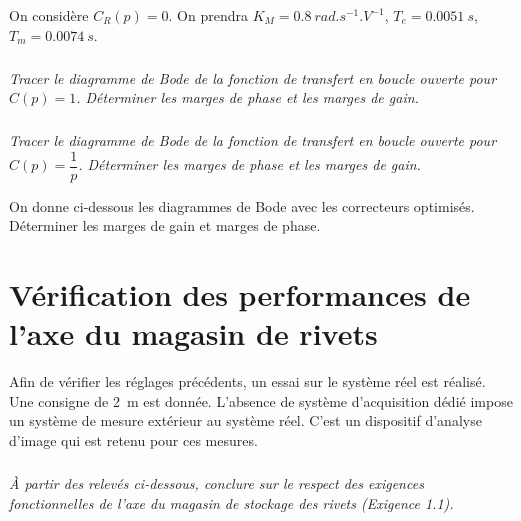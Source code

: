 \documentclass[10pt,fleqn]{article} %
\begin{document}
\begin{multicols}{2}
\ifprof
\else

On considère $C_R (p)=0$. On prendra $K_M=\SI{0,8}{rad.s^{-1}.V^{-1}}$, $T_e=\SI{0,0051}{s}$,$T_m=\SI{0,0074}{s}$.
\fi

\subparagraph{}
\textit{Tracer le diagramme de Bode de la fonction de transfert en boucle ouverte pour $C(p)=1$. Déterminer les marges de phase et les marges de gain.}
\ifprof
\begin{corrige}
\end{corrige}
\else
\fi
 
\subparagraph{}
\textit{Tracer le diagramme de Bode de la fonction de transfert en boucle ouverte pour $C(p)=\dfrac{1}{p}$. Déterminer les marges de phase et les marges de gain.}
\ifprof
\begin{corrige}
\end{corrige}
\else
\fi

\ifprof
\else

On donne ci-dessous les diagrammes de Bode avec les correcteurs optimisés. Déterminer les marges de gain et marges de phase. 
\fi

\section*{Vérification des performances de l'axe du magasin de rivets}
\ifprof
\else

Afin de vérifier les réglages précédents, un essai sur le système réel est réalisé. Une consigne de \SI{2}{m} est donnée. L'absence de système d'acquisition dédié impose un système de mesure extérieur au système réel. C'est un dispositif d'analyse d'image qui est retenu pour ces mesures.
\fi

\subparagraph{}
\textit{À partir des relevés ci-dessous, conclure sur le respect des exigences fonctionnelles de l'axe du magasin de stockage des rivets (Exigence 1.1).}
\ifprof
\begin{corrige}
\end{corrige}
\else
\fi
 
\end{multicols}

\ifprof
\else
\end{document}
